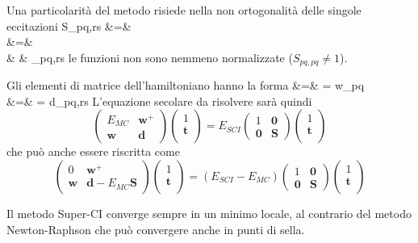 Una particolarit\`a del metodo risiede nella non ortogonalit\`a delle
singole eccitazioni
\beqas
S_{pq,rs} &=&  \\
&=&  \\
& \neq & \delta_{pq,rs}
\eeqas
le funzioni non sono nemmeno normalizzate ($S_{pq,pq} \neq 1$).

Gli elementi di matrice dell'hamiltoniano hanno la forma
\beqas
{} &=&  = w_{pq} \\
 &=&  = d_{pq,rs}
\eeqas
L'equazione secolare da risolvere sar\`a quindi
$$
\left(
\begin{array}{cc}
E_{MC} & \mathbf{w}^+ \\
\mathbf{w} & \mathbf{d}
\end{array} \right)
\left(
\begin{array}{c}
1 \\
\mathbf{t} \\
\end{array}
\right)
= E_{SCI}
\left(
\begin{array}{cc}
1 & \mathbf{0} \\
\mathbf{0} & \mathbf{S}
\end{array}
\right)
\left(
\begin{array}{c}
1 \\
\mathbf{t} \\
\end{array}
\right)
$$
che pu\`o anche essere riscritta come
$$
\left(
\begin{array}{cc}
0 & \mathbf{w}^+ \\
\mathbf{w} & \mathbf{d}-E_{MC}\mathbf{S}
\end{array} \right)
\left(
\begin{array}{c}
1 \\
\mathbf{t} \\
\end{array}
\right)
= \left( E_{SCI} - E_{MC} \right)
\left(
\begin{array}{cc}
1 & \mathbf{0} \\
\mathbf{0} & \mathbf{S}
\end{array}
\right)
\left(
\begin{array}{c}
1 \\
\mathbf{t} \\
\end{array}
\right)
$$

Il metodo Super-CI converge sempre in un minimo locale, al contrario del
metodo Newton-Raphson che pu\`o convergere anche in punti di sella.

